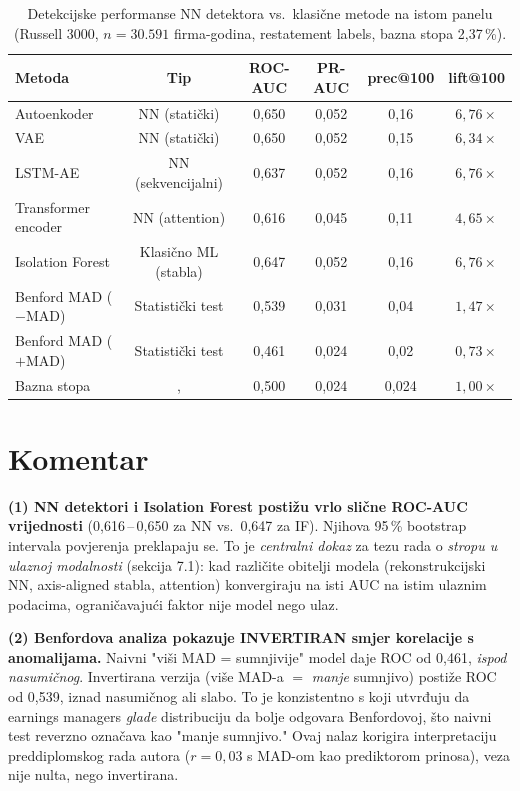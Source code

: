 \documentclass[diplomskirad,authoryear]{fer}
\begin{document}
\begin{table}[h]
\centering
\caption{Detekcijske performanse NN detektora vs.\ klasične metode na istom panelu (Russell 3000, $n=30.591$ firma-godina, restatement labels, bazna stopa 2,37\,\%).}
\label{tab:appendix_baselines}
\begin{tabular}{lccccc}
\toprule
Metoda & Tip & ROC-AUC & PR-AUC & prec@100 & lift@100 \\
\midrule
Autoenkoder & NN (statički) & 0,650 & 0,052 & 0,16 & $6{,}76\times$ \\
VAE & NN (statički) & 0,650 & 0,052 & 0,15 & $6{,}34\times$ \\
LSTM-AE & NN (sekvencijalni) & 0,637 & 0,052 & 0,16 & $6{,}76\times$ \\
Transformer encoder & NN (attention) & 0,616 & 0,045 & 0,11 & $4{,}65\times$ \\
\midrule
Isolation Forest & Klasično ML (stabla) & 0,647 & 0,052 & 0,16 & $6{,}76\times$ \\
Benford MAD ($-$MAD)& Statistički test & 0,539 & 0,031 & 0,04 & $1{,}47\times$ \\
Benford MAD ($+$MAD)& Statistički test & 0,461 & 0,024 & 0,02 & $0{,}73\times$ \\
\midrule
Bazna stopa &, & 0,500 & 0,024 & 0,024 & $1{,}00\times$ \\
\bottomrule
\end{tabular}
\end{table}

\section{Komentar}

\textbf{(1) NN detektori i Isolation Forest postižu vrlo slične ROC-AUC vrijednosti} (0,616\,--\,0,650 za NN vs.\ 0,647 za IF). Njihova 95\,\% bootstrap intervala povjerenja preklapaju se. To je \emph{centralni dokaz} za tezu rada o \emph{stropu u ulaznoj modalnosti} (sekcija 7.1): kad različite obitelji modela (rekonstrukcijski NN, axis-aligned stabla, attention) konvergiraju na isti AUC na istim ulaznim podacima, ograničavajući faktor nije model nego ulaz.

\textbf{(2) Benfordova analiza pokazuje INVERTIRAN smjer korelacije s anomalijama.} Naivni "viši MAD = sumnjivije" model daje ROC od 0,461, \emph{ispod nasumičnog}. Invertirana verzija (više MAD-a $=$ \emph{manje} sumnjivo) postiže ROC od 0,539, iznad nasumičnog ali slabo. To je konzistentno s \citet{amiram2015} koji utvrđuju da earnings managers \emph{glade} distribuciju da bolje odgovara Benfordovoj, što naivni test reverzno označava kao "manje sumnjivo." Ovaj nalaz korigira interpretaciju preddiplomskog rada autora ($r=0{,}03$ s MAD-om kao prediktorom prinosa), veza nije nulta, nego invertirana.
\end{document}
